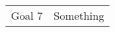 \documentclass{article}
\newenvironment{tablegoals}[1]
		{\begin{tabular}{l|>{\columncolor{#1}}c}}
		{\end{tabular}}
\begin{document}
\begin{tablegoals}{SkyBlue!30}
	Goal 7  & Something \\
\end{tablegoals}
\end{document}
